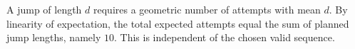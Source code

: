 A jump of length $d$ requires a geometric number of attempts with mean $d$. By linearity of expectation, the total expected attempts equal the sum of planned jump lengths, namely $\boxed{10}$. This is independent of the chosen valid sequence.
